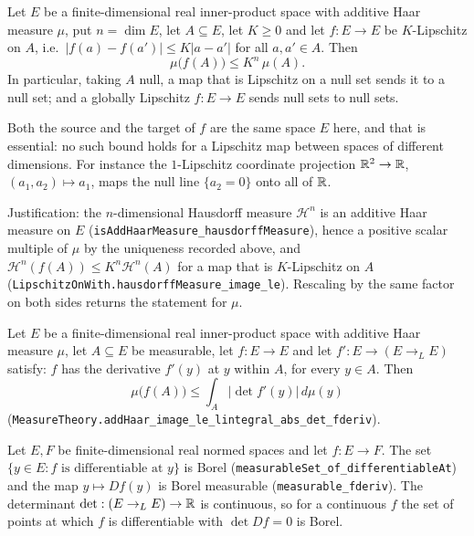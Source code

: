 \begin{proposition}
Let $E$ be a finite-dimensional real inner-product space with additive Haar
measure $\mu$, put $n=\dim E$, let $A\subseteq E$, let $K\ge0$ and let
$f:E\to E$ be $K$-Lipschitz on $A$, i.e.\ $|f(a)-f(a')|\le K|a-a'|$ for all
$a,a'\in A$. Then
\[
  \mu\bigl(f(A)\bigr)\le K^{n}\,\mu(A).
\]
In particular, taking $A$ null, a map that is Lipschitz on a null set sends it
to a null set; and a globally Lipschitz $f:E\to E$ sends null sets to null sets.

Both the source and the target of $f$ are the same space $E$ here, and that is
essential: no such bound holds for a Lipschitz map between spaces of different
dimensions. For instance the $1$-Lipschitz coordinate projection
$\mathbb{R}^2\to\mathbb{R}$, $(a_1,a_2)\mapsto a_1$, maps the null line $\{a_2=0\}$ onto all of
$\mathbb{R}$.

Justification: the $n$-dimensional Hausdorff measure $\mathcal H^{n}$ is an
additive Haar measure on $E$
(\texttt{isAddHaarMeasure\_hausdorffMeasure}), hence a positive scalar multiple
of $\mu$ by the uniqueness recorded above, and
$\mathcal H^{n}(f(A))\le K^{n}\mathcal H^{n}(A)$ for a map that is $K$-Lipschitz
on $A$ (\texttt{LipschitzOnWith.hausdorffMeasure\_image\_le}). Rescaling by the
same factor on both sides returns the statement for $\mu$.
\end{proposition}

\begin{proposition}
Let $E$ be a finite-dimensional real inner-product space with additive Haar
measure $\mu$, let $A\subseteq E$ be measurable, let $f:E\to E$ and let
$f':E\to(E\to_{L}E)$ satisfy: $f$ has the derivative $f'(y)$ at $y$ within $A$,
for every $y\in A$. Then
\[
  \mu\bigl(f(A)\bigr)\le\int_A\bigl|\det f'(y)\bigr|\,d\mu(y)
\]
(\texttt{MeasureTheory.addHaar\_image\_le\_lintegral\_abs\_det\_fderiv}).
\end{proposition}

\begin{proposition}
Let $E,F$ be finite-dimensional real normed spaces and let $f:E\to F$. The set
$\{y\in E:f\text{ is differentiable at }y\}$ is Borel
(\texttt{measurableSet\_of\_differentiableAt}) and the map $y\mapsto Df(y)$ is
Borel measurable (\texttt{measurable\_fderiv}). The determinant
$\det:(E\to_{L}E)\to\mathbb{R}$ is continuous, so for a continuous $f$ the set of points
at which $f$ is differentiable with $\det Df=0$ is Borel.
\end{proposition}

